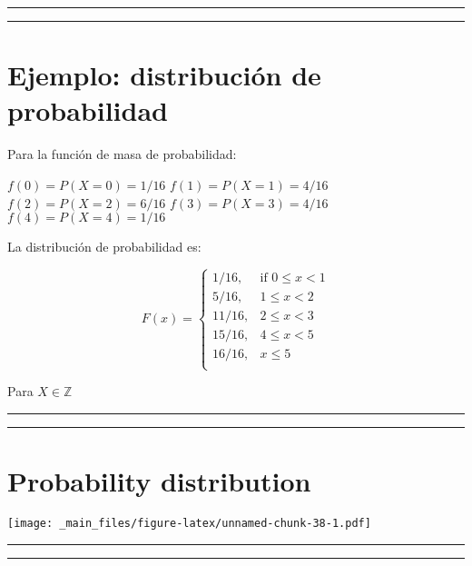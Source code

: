 \documentclass[
]{book}
\begin{document}
\begin{center}\rule{0.5\linewidth}{0.5pt}\end{center}

\begin{center}\rule{0.5\linewidth}{0.5pt}\end{center}

\hypertarget{ejemplo-distribuciuxf3n-de-probabilidad}{%
\section{Ejemplo: distribución de probabilidad}\label{ejemplo-distribuciuxf3n-de-probabilidad}}

Para la función de masa de probabilidad:

\(f(0)=P(X=0)=1/16\)
\(f(1)=P(X=1)=4/16\)
\(f(2)=P(X=2)=6/16\)
\(f(3)=P(X=3)=4/16\)
\(f(4)=P(X=4)=1/16\)

La distribución de probabilidad es:

\[
    F(x)=
\begin{cases}
    1/16,& \text{if } 0 \leq x < 1\\
    5/16,& 1\leq x < 2\\
    11/16,& 2\leq x < 3\\
    15/16,& 4\leq x < 5\\
    16/16,&  x \leq 5\\
\end{cases}
\]

Para \(X \in \mathbb{Z}\)

\begin{center}\rule{0.5\linewidth}{0.5pt}\end{center}

\begin{center}\rule{0.5\linewidth}{0.5pt}\end{center}

\hypertarget{probability-distribution}{%
\section{Probability distribution}\label{probability-distribution}}

\texttt{[image: \_main\_files/figure-latex/unnamed-chunk-38-1.pdf]}

\begin{center}\rule{0.5\linewidth}{0.5pt}\end{center}

\begin{center}\rule{0.5\linewidth}{0.5pt}\end{center}
\end{document}
